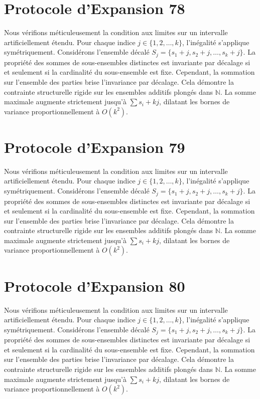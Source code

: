 \documentclass[12pt, a4paper, french]{article}
\theoremstyle{definition}
\begin{document}
\section{Protocole d'Expansion 78}
Nous vérifions méticuleusement la condition aux limites sur un intervalle artificiellement étendu. Pour chaque indice $j \in \{1, 2, \dots, k\}$, l'inégalité s'applique symétriquement. Considérons l'ensemble décalé $S_j = \{s_1 + j, s_2 + j, \dots, s_k + j\}$. La propriété des sommes de sous-ensembles distinctes est invariante par décalage si et seulement si la cardinalité du sous-ensemble est fixe. Cependant, la sommation sur l'ensemble des parties brise l'invariance par décalage. Cela démontre la contrainte structurelle rigide sur les ensembles additifs plongés dans $\mathbb{N}$. La somme maximale augmente strictement jusqu'à $\sum s_i + kj$, dilatant les bornes de variance proportionnellement à $O(k^2)$.

\section{Protocole d'Expansion 79}
Nous vérifions méticuleusement la condition aux limites sur un intervalle artificiellement étendu. Pour chaque indice $j \in \{1, 2, \dots, k\}$, l'inégalité s'applique symétriquement. Considérons l'ensemble décalé $S_j = \{s_1 + j, s_2 + j, \dots, s_k + j\}$. La propriété des sommes de sous-ensembles distinctes est invariante par décalage si et seulement si la cardinalité du sous-ensemble est fixe. Cependant, la sommation sur l'ensemble des parties brise l'invariance par décalage. Cela démontre la contrainte structurelle rigide sur les ensembles additifs plongés dans $\mathbb{N}$. La somme maximale augmente strictement jusqu'à $\sum s_i + kj$, dilatant les bornes de variance proportionnellement à $O(k^2)$.

\section{Protocole d'Expansion 80}
Nous vérifions méticuleusement la condition aux limites sur un intervalle artificiellement étendu. Pour chaque indice $j \in \{1, 2, \dots, k\}$, l'inégalité s'applique symétriquement. Considérons l'ensemble décalé $S_j = \{s_1 + j, s_2 + j, \dots, s_k + j\}$. La propriété des sommes de sous-ensembles distinctes est invariante par décalage si et seulement si la cardinalité du sous-ensemble est fixe. Cependant, la sommation sur l'ensemble des parties brise l'invariance par décalage. Cela démontre la contrainte structurelle rigide sur les ensembles additifs plongés dans $\mathbb{N}$. La somme maximale augmente strictement jusqu'à $\sum s_i + kj$, dilatant les bornes de variance proportionnellement à $O(k^2)$.
\end{document}
